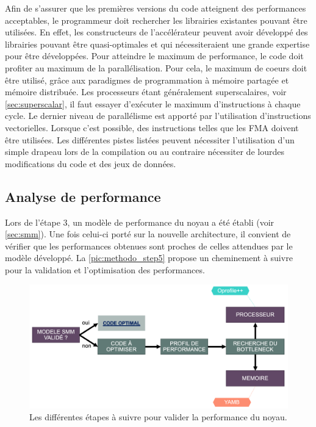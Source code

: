         Afin de s'assurer que les premières versions du code atteignent des performances acceptables, le programmeur doit rechercher les librairies existantes pouvant être utilisées. En effet, les constructeurs de l'accélérateur peuvent avoir développé des librairies pouvant être quasi-optimales et qui nécessiteraient une grande expertise pour être développées. Pour atteindre le maximum de performance, le code doit profiter au maximum de la parallélisation. Pour cela, le maximum de coeurs doit être utilisé, grâce aux paradigmes de programmation à mémoire partagée et mémoire distribuée. Les processeurs étant généralement superscalaires, voir \autoref{sec:superscalar}, il faut essayer d'exécuter le maximum d'instructions à chaque cycle. Le dernier niveau de parallélisme est apporté par l'utilisation d'instructions vectorielles. Lorsque c'est possible, des instructions telles que les \gls{FMA} doivent être utilisées. Les différentes pistes listées peuvent nécessiter l'utilisation d'un simple drapeau lors de la compilation ou au contraire nécessiter de lourdes modifications du code et des jeux de données.
    
    
\subsection{Analyse de performance}

    Lors de l'étape 3, un modèle de performance du noyau a été établi (voir \autoref{sec:smm}). Une fois celui-ci porté sur la nouvelle architecture, il convient de vérifier que les performances obtenues sont proches de celles attendues par le modèle développé. La \autoref{pic:methodo_step5} propose un cheminement à suivre pour la validation et l'optimisation des performances.

\begin{figure}[h!]
    \center
    \includegraphics[width=14cm]{images/methodo_step5.png}
    \caption{\label{pic:methodo_step5}Les différentes étapes à suivre pour valider la performance du noyau.}
\end{figure}




